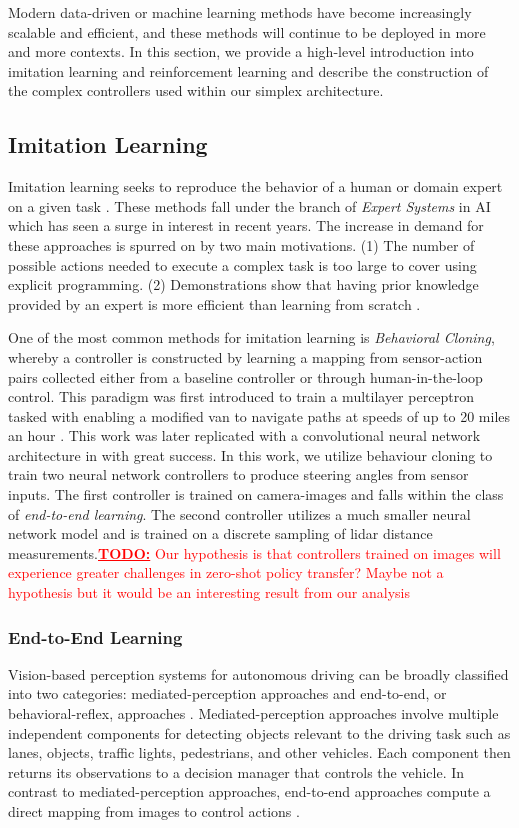 \documentclass[manuscript,screen,review]{acmart}
\newcommand{\todo}[1]{\textcolor{red}{\textbf{\underline{TODO:}} #1}}
\begin{document}
Modern data-driven or machine learning methods have become increasingly scalable and efficient, and these methods will continue to be deployed in more and more contexts. In this section, we provide a high-level introduction into imitation learning and reinforcement learning and describe the construction of the complex controllers used within our simplex architecture.

\subsection{Imitation Learning}

Imitation learning seeks to reproduce the behavior of a human or domain expert on a given task \cite{Hussein2017ImitationL}. These methods fall under the branch of \textit{Expert Systems} in AI which has seen a surge in interest in recent years. The increase in demand for these approaches is spurred on by two main motivations. (1) The number of possible actions needed to execute a complex task is too large to cover using explicit programming. (2) Demonstrations show that having prior knowledge provided by an expert is more efficient than learning from scratch \cite{Hussein2017ImitationL}.

One of the most common methods for imitation learning is \textit{Behavioral Cloning}, whereby a controller is constructed by learning a mapping from sensor-action pairs collected either from a baseline controller or through human-in-the-loop control. This paradigm was first introduced to train a multilayer perceptron tasked with enabling a modified van to navigate paths at speeds of up to 20 miles an hour \cite{pomerleau1989alvinn}. This work was later replicated with a convolutional neural network architecture in \cite{bojarski2016end} with great success. In this work, we utilize behaviour cloning to train two neural network controllers to produce steering angles from sensor inputs. The first controller is trained on camera-images and falls within the class of \textit{end-to-end learning}. The second controller utilizes a much smaller neural network model and is trained on a discrete sampling of lidar distance measurements.\todo{Our hypothesis is that controllers trained on images will experience greater challenges in zero-shot policy transfer? Maybe not a hypothesis but it would be an interesting result from our analysis}

\subsubsection{End-to-End Learning}
Vision-based perception systems for autonomous driving can be broadly classified into two categories: mediated-perception approaches and end-to-end, or behavioral-reflex, approaches \cite{DeepDrive2015}. Mediated-perception approaches involve multiple independent components for detecting objects relevant to the driving task such as lanes, objects, traffic lights, pedestrians, and other vehicles. Each component then returns its observations to a decision manager that controls the vehicle. In contrast to mediated-perception approaches, end-to-end approaches compute a direct mapping from images to control actions \cite{DirectPerception2019,AlexNet2012}. 
\end{document}
